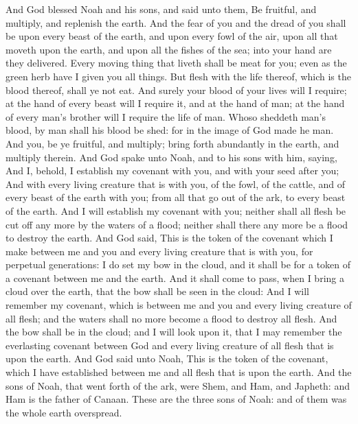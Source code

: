 \begin{biblechapter} %
\verse And God blessed Noah and his sons, and said unto them, Be fruitful, and multiply, and replenish the earth.
\verse And the fear of you and the dread of you shall be upon every beast of the earth, and upon every fowl of the air, upon all that moveth upon the earth, and upon all the fishes of the sea; into your hand are they delivered.
\verse Every moving thing that liveth shall be meat for you; even as the green herb have I given you all things.
\verse But flesh with the life thereof, which is the blood thereof, shall ye not eat.
\verse And surely your blood of your lives will I require; at the hand of every beast will I require it, and at the hand of man; at the hand of every man's brother will I require the life of man.
\verse Whoso sheddeth man's blood, by man shall his blood be shed: for in the image of God made he man.
\verse And you, be ye fruitful, and multiply; bring forth abundantly in the earth, and multiply therein.
\verse And God spake unto Noah, and to his sons with him, saying,
\verse And I, behold, I establish my covenant with you, and with your seed after you;
\verse And with every living creature that is with you, of the fowl, of the cattle, and of every beast of the earth with you; from all that go out of the ark, to every beast of the earth.
\verse And I will establish my covenant with you; neither shall all flesh be cut off any more by the waters of a flood; neither shall there any more be a flood to destroy the earth.
\verse And God said, This is the token of the covenant which I make between me and you and every living creature that is with you, for perpetual generations:
\verse I do set my bow in the cloud, and it shall be for a token of a covenant between me and the earth.
\verse And it shall come to pass, when I bring a cloud over the earth, that the bow shall be seen in the cloud:
\verse And I will remember my covenant, which is between me and you and every living creature of all flesh; and the waters shall no more become a flood to destroy all flesh.
\verse And the bow shall be in the cloud; and I will look upon it, that I may remember the everlasting covenant between God and every living creature of all flesh that is upon the earth.
\verse And God said unto Noah, This is the token of the covenant, which I have established between me and all flesh that is upon the earth.
\verse And the sons of Noah, that went forth of the ark, were Shem, and Ham, and Japheth: and Ham is the father of Canaan.
\verse These are the three sons of Noah: and of them was the whole earth overspread.

\end{biblechapter}

